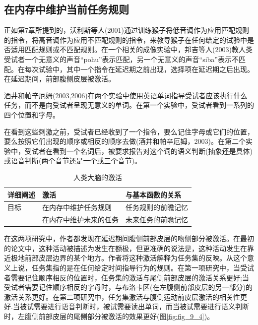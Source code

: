 \subsection{在内存中维护当前任务规则}
\par
正如第7章所提到的，沃利斯等人(2001)通过训练猴子将低音调作为应用匹配规则的指令，将高音调作为应用不匹配规则的指令，来教导猴子在任何给定的试验中是否适用匹配规则或不匹配规则。在一个相关的成像实验中，邦吉等人(2003)教人类受试者一个无意义的声音“pohu”表示匹配，另一个无意义的声音“siba”表示不匹配。在每次试验中，其中一个指令在延迟期之前出现，选择项在延迟期之后出现。在延迟期间，前部腹侧皮层被激活。
\par
酒井和帕辛厄姆(2003,2006)在两个实验中使用英语单词指导受试者应该执行什么任务，而不是向受试者呈现无意义的单词。在第一个实验中，受试者看到一系列的四个位置和字母。
\par
在看到这些刺激之前，受试者已经收到了一个指令，要么记住字母或它们的位置，要么按照它们出现的顺序或相反的顺序去做(酒井和帕辛厄姆，2003)。在第二个实验中，受试者在看到一个名词后，被要求报告对这个词的语义判断(抽象还是具体)或语音判断(两个音节还是一个或三个音节)。

\begin{table}[htbp] 
	\newcommand{\tabincell}[2]{\begin{tabular}{@{}#1@{}}#2\end{tabular}} %
	\centering
	\caption{人类大脑的激活\label{tab:9_3}}
	\renewcommand\arraystretch{1.5}	%
	\begin{tabular}{lll}
		\toprule
		详细阐述 & 激活 & 与基本函数的关系\\
		\midrule
		目标 & 在内存中维护任务规则 & 任务规则的前瞻记忆  \\
		& 在内存中维护未来的任务 & 未来任务的前瞻记忆 \\
		\bottomrule
		
	\end{tabular}%
\end{table}%
\par
在这两项研究中，作者都发现在延迟期间腹侧前部皮层的吻侧部分被激活。在最初的论文中，这种活动被描述为发生在额极，但更准确的说法是，这种活动发生在靠近极地前部皮层边界的某个地方。作者将这种激活解释为任务集的反映。从这个意义上说，任务集指的是在任何给定时间指导行为的规则。在第一项研究中，当受试者需要记住顺序相反的位置时，任务集的激活与尾侧前部皮层的激活关系更好;当受试者需要记住顺序相反的字母时，与布洛卡区(在左腹侧前部皮层的另一部分)的激活关系更好。在第二项研究中，任务集激活与腹侧运动前皮层激活的相关性更好.当被试需要进行语音判断时，被试需要读出单词，而当被试需要进行语义判断时，左腹侧前部皮层的尾侧部分被激活的效果更好(图\ref{fig:fig_9_4})。

